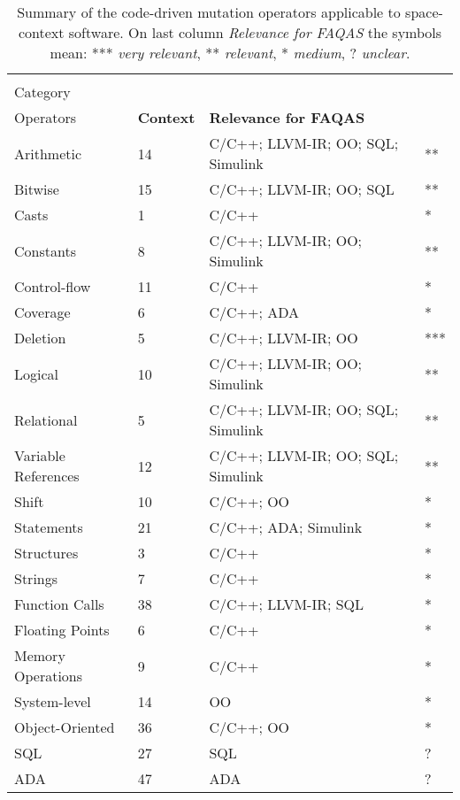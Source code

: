 


\setlength\LTleft{0pt}
\setlength\LTright{0pt}
\small 
\begin{longtable}{@{\extracolsep{\fill}}|l|l|l|l|@{}}
\caption{\normalsize Summary of the code-driven mutation operators applicable to space-context software. On last column \emph{Relevance for FAQAS} the symbols mean: *** \textit{very relevant}, ** \textit{relevant}, * \textit{medium}, ? \textit{unclear}.}
\label{table:codeoperatorssummary} \\
\hline

	\textbf{\begin{tabular}[c]{@{}l@{}}Operator\\Category\end{tabular}}	&	\textbf{\begin{tabular}[c]{@{}l@{}}Number of\\Operators\end{tabular}}	&	\textbf{Context}	&	\textbf{Relevance for FAQAS}\\

\hline
	Arithmetic			&	14	&	C/C++; LLVM-IR; OO; SQL; Simulink	& **\\
	Bitwise				&	15	&	C/C++; LLVM-IR; OO; SQL 			& **\\
	Casts				&	1	&	C/C++ 								& *\\
	Constants			&	8	&	C/C++; LLVM-IR; OO; Simulink 		& **\\
	Control-flow		&	11	&	C/C++ & *\\
	Coverage			&	6	&	C/C++; ADA & *\\
	Deletion			&	5	&	C/C++; LLVM-IR; OO & ***\\
	Logical				&	10	&	C/C++; LLVM-IR; OO; Simulink & **\\
	Relational			&	5	&	C/C++; LLVM-IR; OO; SQL; Simulink & **\\
	Variable References	&	12	&	C/C++; LLVM-IR; OO; SQL; Simulink & **\\
	Shift				&	10	&	C/C++; OO & *\\
	Statements			&	21	&	C/C++; ADA; Simulink & *\\
	Structures			&	3	&	C/C++ & *\\
	Strings				&	7	&	C/C++ & *\\
	Function Calls		&	38	&	C/C++; LLVM-IR; SQL & *\\
	Floating Points		&	6	&	C/C++ & *\\
	Memory Operations	&	9	&	C/C++ & *\\
	System-level		&	14	&	OO & *\\
	Object-Oriented		&	36	&	C/C++; OO & *\\
	SQL					&	27	&	SQL & ?\\
	ADA					&	47	&	ADA & ?\\
\bottomrule                                                             
\end{longtable}
\normalsize